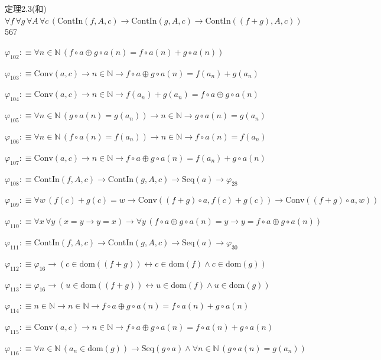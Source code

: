 \begin{fullproof}{定理2.3(和)}{$\forall f\,\forall g\,\forall A\,\forall c\,(\mathrm{ContIn}(f,A,c) \to \mathrm{ContIn}(g,A,c) \to \mathrm{ContIn}((f + g),A,c))$}{567}
\begin{abbrevlist}
\item $\varphi_{102} :\equiv \forall n \in \mathbb{N}\,(f \circ a \oplus g \circ a(n) = f \circ a(n) + g \circ a(n))$
\item $\varphi_{103} :\equiv \mathrm{Conv}(a,c) \to n \in \mathbb{N} \to f \circ a \oplus g \circ a(n) = f(a_{n}) + g(a_{n})$
\item $\varphi_{104} :\equiv \mathrm{Conv}(a,c) \to n \in \mathbb{N} \to f(a_{n}) + g(a_{n}) = f \circ a \oplus g \circ a(n)$
\item $\varphi_{105} :\equiv \forall n \in \mathbb{N}\,(g \circ a(n) = g(a_{n})) \to n \in \mathbb{N} \to g \circ a(n) = g(a_{n})$
\item $\varphi_{106} :\equiv \forall n \in \mathbb{N}\,(f \circ a(n) = f(a_{n})) \to n \in \mathbb{N} \to f \circ a(n) = f(a_{n})$
\item $\varphi_{107} :\equiv \mathrm{Conv}(a,c) \to n \in \mathbb{N} \to f \circ a \oplus g \circ a(n) = f(a_{n}) + g \circ a(n)$
\item $\varphi_{108} :\equiv \mathrm{ContIn}(f,A,c) \to \mathrm{ContIn}(g,A,c) \to \mathrm{Seq}(a) \to \varphi_{28}$
\item $\varphi_{109} :\equiv \forall w\,(f(c) + g(c) = w \to \mathrm{Conv}((f + g) \circ a,f(c) + g(c)) \to \mathrm{Conv}((f + g) \circ a,w))$
\item $\varphi_{110} :\equiv \forall x\,\forall y\,(x = y \to y = x) \to \forall y\,(f \circ a \oplus g \circ a(n) = y \to y = f \circ a \oplus g \circ a(n))$
\item $\varphi_{111} :\equiv \mathrm{ContIn}(f,A,c) \to \mathrm{ContIn}(g,A,c) \to \mathrm{Seq}(a) \to \varphi_{30}$
\item $\varphi_{112} :\equiv \varphi_{16} \to (c \in \mathrm{dom}((f + g)) \leftrightarrow c \in \mathrm{dom}(f) \land c \in \mathrm{dom}(g))$
\item $\varphi_{113} :\equiv \varphi_{16} \to (u \in \mathrm{dom}((f + g)) \leftrightarrow u \in \mathrm{dom}(f) \land u \in \mathrm{dom}(g))$
\item $\varphi_{114} :\equiv n \in \mathbb{N} \to n \in \mathbb{N} \to f \circ a \oplus g \circ a(n) = f \circ a(n) + g \circ a(n)$
\item $\varphi_{115} :\equiv \mathrm{Conv}(a,c) \to n \in \mathbb{N} \to f \circ a \oplus g \circ a(n) = f \circ a(n) + g \circ a(n)$
\item $\varphi_{116} :\equiv \forall n \in \mathbb{N}\,(a_{n} \in \mathrm{dom}(g)) \to \mathrm{Seq}(g \circ a) \land \forall n \in \mathbb{N}\,(g \circ a(n) = g(a_{n}))$

\end{abbrevlist}
\end{fullproof}
